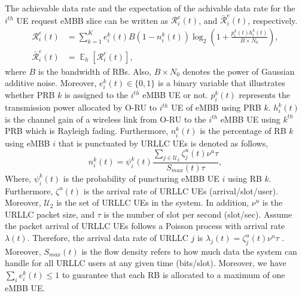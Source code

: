 \documentclass[conference]{IEEEtran}
\DeclareMathOperator{\E}{\mathbb{E}}
\begin{document}
The achievable data rate and the expectation of the achivable data rate for the $i^{th}$ UE request eMBB slice can be written as $\mathcal{R}_{i}^{e}(t)$, and $\bar{\mathcal{R}}_{i}^e(t)$, respectively.
\begin{equation}\label{eq1}
\begin{split}
\mathcal{R}_{i}^e(t) &= \sum_{k = 1}^K e^k_i(t) B (1-{n^k_i(t)}) \log_2({1+\frac{p^k_i(t)h^k_i(t)}{B \times N_0}}),\\
\bar{\mathcal{R}}_{i}^e(t) &= \E_{h}[\mathcal{R}_{i}^e(t)],
\end{split}
\end{equation}
where $B$ is the bandwidth of RBs. Also, $B\times N_0$ denotes the power of Gaussian additive noise. 
Moreover, $e^k_i(t)\in \{0,1\}$ is a binary variable that illustrates whether PRB $k$ is assigned to the $i^{th}$ eMBB UE or not. 
$p^k_i(t)$ represents the transmission power allocated by O-RU to $i^{th}$ UE of eMBB using PRB $k$.
$h^k_i(t)$ is the channel gain of a wireless link from 
O-RU to the $i^{th}$ eMBB UE using $k^{th}$ PRB which is Rayleigh fading.
Furthermore, $n^k_i(t)$ is the percentage of RB $k$ using eMBB $i$ that is punctuated by URLLC UEs is denoted as follows,
\begin{equation}
n^k_i(t) = \psi^k_i(t) \frac{\sum_{j \in \mathcal{U}_2}{\zeta}^u_{j}(t){\nu}^u \tau}{S_{max}(t)\tau},
\end{equation}
Where, $\psi^k_i(t)$ is the probability of puncturing eMBB UE $i$ using RB $k$.
Furthermore, ${\zeta}^u(t)$ is the arrival rate of URLLC UEs (arrival/slot/user).
Moreover, $\mathcal{U}_2$ is the set of URLLC UEs in the system.
In addition, $\nu^u$ is the URLLC packet size, and $\tau$ is the number of slot per second (slot/sec).
Assume the packet arrival of URLLC UEs follows a Poisson process with arrival rate $\lambda(t)$.
Therefore, the arrival data rate of URLLC $j$ is $\lambda_j(t) = {\zeta}^u_{j}(t){\nu}^u \tau$ .
Moreover, $S_{max}(t)$ is the flow density refers to how much data the system can handle for all URLLC users at any given time (bits/slot).
Moreover, we have $\sum_i e_i^k(t)\le 1$ to guarantee that each RB is allocated to a maximum of one eMBB UE.
\end{document}
